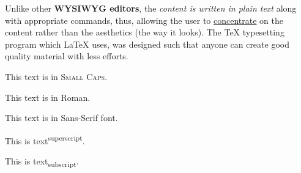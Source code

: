 \documentclass{article}
\begin{document}
	Unlike other \textbf{WYSIWYG editors}, the \emph{content is written in plain text} along with appropriate commands, thus, allowing the user to \underline{concentrate} on the content rather than the aesthetics (the way it looks). The TeX typesetting program which LaTeX uses, was designed such that anyone can create good quality material with less efforts.
	
	This text is in \textsc{Small Caps}.
	
	This text is in \textrm{Roman}.
	
	This text is in \textsf{Sans-Serif font}.
	
	This is text\textsuperscript{superscript}.
	
	This is text\textsubscript{subscript}.
\end{document}

